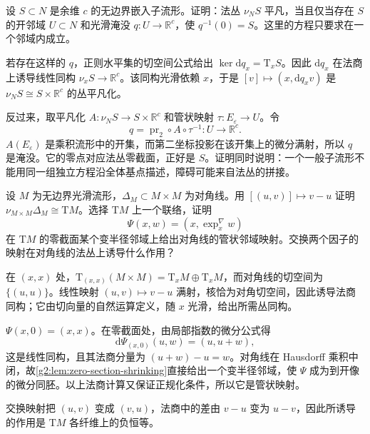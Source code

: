 \begin{exercise}\label{g2:ex:normal-trivial-defining-map}
	设 \(S\subset N\) 是余维 \(c\) 的无边界嵌入子流形。证明：法丛 \(\nu_NS\) 平凡，当且仅当存在 \(S\) 的开邻域 \(U\subset N\) 和光滑淹没 \(q:U\to\mathbb R^c\)，使 \(q^{-1}(0)=S\)。这里的方程只要求在一个邻域内成立。
\end{exercise}
\begin{solution}
	若存在这样的 \(q\)，正则水平集的切空间公式给出 \(\ker\mathrm{d}q_x=\mathrm{T}_xS\)。因此 \(\mathrm{d}q_x\) 在法商上诱导线性同构 \(\nu_xS\to\mathbb R^c\)。该同构光滑依赖 \(x\)，于是 \([v]\mapsto(x,\mathrm{d}q_xv)\) 是 \(\nu_NS\cong S\times\mathbb R^c\) 的丛平凡化。

	反过来，取平凡化 \(A:\nu_NS\to S\times\mathbb R^c\) 和管状映射 \(\tau:E_\varepsilon\to U\)。令
	\[
		q=\operatorname{pr}_2\circ A\circ\tau^{-1}:U\to\mathbb R^c.
	\]
	\(A(E_\varepsilon)\) 是乘积流形中的开集，而第二坐标投影在该开集上的微分满射，所以 \(q\) 是淹没。它的零点对应法丛零截面，正好是 \(S\)。证明同时说明：一个一般子流形不能用同一组独立方程沿全体基点描述，障碍可能来自法丛的拼接。
\end{solution}

\begin{exercise}\label{g2:ex:diagonal-tubular-model}
	设 \(M\) 为无边界光滑流形，\(\Delta_M\subset M\times M\) 为对角线。用 \([(u,v)]\mapsto v-u\) 证明 \(\nu_{M\times M}\Delta_M\cong\mathrm{T}M\)。选择 \(\mathrm{T}M\) 上一个联络，证明
	\[
		\Psi(x,w)=(x,\exp_x^\nabla w)
	\]
	在 \(\mathrm{T}M\) 的零截面某个变半径邻域上给出对角线的管状邻域映射。交换两个因子的映射在对角线的法丛上诱导什么作用？
\end{exercise}
\begin{solution}
	在 \((x,x)\) 处，\(\mathrm{T}_{(x,x)}(M\times M)=\mathrm{T}_xM\oplus\mathrm{T}_xM\)，而对角线的切空间为 \(\{(u,u)\}\)。线性映射 \((u,v)\mapsto v-u\) 满射，核恰为对角切空间，因此诱导法商同构；它由切向量的自然运算定义，随 \(x\) 光滑，给出所需丛同构。

	\(\Psi(x,0)=(x,x)\)。在零截面处，由局部指数的微分公式得
	\[
		\mathrm{d}\Psi_{(x,0)}(u,w)=(u,u+w),
	\]
	这是线性同构，且其法商分量为 \((u+w)-u=w\)。对角线在 Hausdorff 乘积中闭，故\cref{g2:lem:zero-section-shrinking}直接给出一个变半径邻域，使 \(\Psi\) 成为到开像的微分同胚。以上法商计算又保证正规化条件，所以它是管状映射。

	交换映射把 \((u,v)\) 变成 \((v,u)\)，法商中的差由 \(v-u\) 变为 \(u-v\)，因此所诱导的作用是 \(\mathrm{T}M\) 各纤维上的负恒等。
\end{solution}

